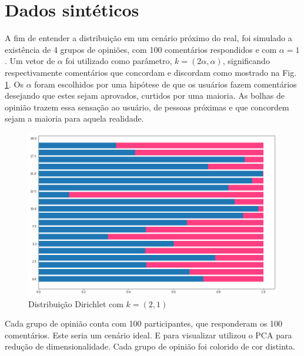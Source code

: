 \section{Dados sintéticos}

A fim de entender a distribuição em um cenário próximo do real, foi simulado a existência de 4 grupos de opiniões, com 100 comentários respondidos e com $\alpha = 1$. Um vetor de $\alpha$ foi utilizado como parâmetro, $k=(2\alpha, \alpha)$, significando respectivamente comentários que concordam e discordam como mostrado na Fig. \ref{dist-dir:2alphas}. Os $\alpha$ foram escolhidos por uma hipótese de que os usuários fazem comentários desejando que estes sejam aprovados, curtidos por uma maioria. As bolhas de opinião trazem essa sensação ao usuário, de pessoas próximas e que concordem sejam a maioria para aquela realidade.



\begin{figure}[!h]
	\centering
	\includegraphics[keepaspectratio=true,scale=0.35]{figuras/resultados-dist-dir-2-alfas.png}
	\caption{Distribuição Dirichlet com $k=(2, 1)$}
	\label{dist-dir:2alphas}
\end{figure}



Cada grupo de opinião conta com 100 participantes, 
que responderam os 100 comentários. Este seria um cenário ideal. E para visualizar utilizou o PCA para redução de dimensionalidade. Cada grupo de opinião foi colorido de cor distinta.


